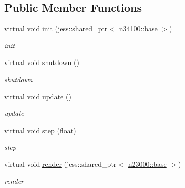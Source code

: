 \subsection*{Public Member Functions}
\begin{DoxyCompactItemize}
\item 
virtual void \hyperlink{classnebula_1_1content_1_1actor_1_1renderer_1_1actor_a67bf8a3f3b53c523edced67701af7bf0}{init} (jess::shared\_\-ptr$<$ \hyperlink{classnebula_1_1content_1_1actor_1_1admin_1_1base}{n34100::base} $>$)
\begin{DoxyCompactList}\small\item\em init \item\end{DoxyCompactList}\item 
virtual void \hyperlink{classnebula_1_1content_1_1actor_1_1renderer_1_1actor_a3c051be72600dbc471e16e3c6ff53c52}{shutdown} ()
\begin{DoxyCompactList}\small\item\em shutdown \item\end{DoxyCompactList}\item 
virtual void \hyperlink{classnebula_1_1content_1_1actor_1_1renderer_1_1actor_aec0ddac9c76aa3360fe97b49a651e1e2}{update} ()
\begin{DoxyCompactList}\small\item\em update \item\end{DoxyCompactList}\item 
virtual void \hyperlink{classnebula_1_1content_1_1actor_1_1renderer_1_1actor_ab35c8c44d2603c17f4822cdef8be93bf}{step} (float)
\begin{DoxyCompactList}\small\item\em step \item\end{DoxyCompactList}\item 
virtual void \hyperlink{classnebula_1_1content_1_1actor_1_1renderer_1_1actor_ab54b9148460295b161e12a2e6b3573d0}{render} (jess::shared\_\-ptr$<$ \hyperlink{classnebula_1_1platform_1_1renderer_1_1base}{n23000::base} $>$)
\begin{DoxyCompactList}\small\item\em render \item\end{DoxyCompactList}\end{DoxyCompactItemize}
